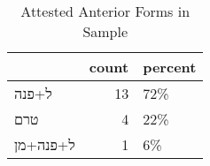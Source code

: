 \begin{table}[htbp!]
\centering
\caption{Attested Anterior Forms in Sample}
\label{table:ant_front}
\begin{tabular}{lrl}
\toprule
{} &  count & percent \\
\midrule
\texthebrew{ל+פנה}    &     13 &     72\% \\
\texthebrew{טרם}      &      4 &     22\% \\
\texthebrew{ל+פנה+מן} &      1 &      6\% \\
\bottomrule
\end{tabular}
\end{table}
